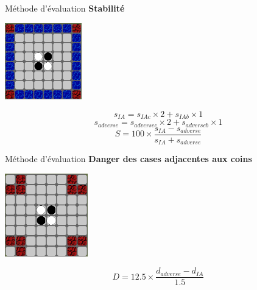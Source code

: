 \begin{frame}[t]{Méthode d'évaluation}
    \textbf{Stabilité}
    \hspace{0.2\textwidth}
    \begin{center}
        \includegraphics[width=0.25\textwidth]{img/stabilite.png}
    \end{center}
    \[
        s_{IA} = s_{IAc} \times 2 + s_{IAb} \times 1
    \]
    \[
        s_{adverse} = s_{adversec} \times 2 + s_{adverseb} \times 1
    \]
    \[
        S = 100 \times \frac{s_{IA} - s_{adverse}}{s_{IA} + s_{adverse}}
    \]
\end{frame}

\begin{frame}[t]{Méthode d'évaluation}
    \textbf{Danger des cases adjacentes aux coins}
    \hspace{0.2\textwidth}
    \begin{center}
        \includegraphics[width=0.27\textwidth]{img/danger_adj.png}
    \end{center}
    \hspace{0.5\textwidth}
    \[
        D = 12.5 \times \frac{d_{adverse} - d_{IA}}{1.5}
    \]
\end{frame}

